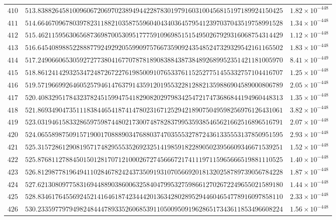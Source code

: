 \documentclass[12pt,reqno]{amsart}
\theoremstyle{remark}
\begin{document}
\begin{longtable}{clc}
$410$ & $513.8388264581009606720697023894944228783019791603100456815197189924150425$ & $1.82\times 10^{-448}$ \\
$411$ & $514.6646709678039782311882103587559604043403645795412397037043519758991528$ & $1.34\times 10^{-448}$ \\
$412$ & $515.4621159563065687369870053095177759109698515154950267929316068754314429$ & $1.12\times 10^{-448}$ \\
$413$ & $516.6454089885228887792492920559909757667359092435485247329329542161165502$ & $1.83\times 10^{-448}$ \\
$414$ & $517.2490660653059272773804167707878189083884387384892689952351421181005970$ & $8.41\times 10^{-449}$ \\
$415$ & $518.8612414293253472487267227619850091076533761152527751455332757104416707$ & $1.25\times 10^{-448}$ \\
$416$ & $519.5719669926460525794614763791435912019553228128821359886904589000806789$ & $2.05\times 10^{-448}$ \\
$417$ & $520.4083295178432378245159947541829082029798342547217473686844194960448313$ & $1.35\times 10^{-448}$ \\
$418$ & $521.8693490473511183844654187414780231671252942189075049598256976126431061$ & $3.82\times 10^{-448}$ \\
$419$ & $523.0319461583328659759874480217300748782837995359385465621662516896516791$ & $2.07\times 10^{-448}$ \\
$420$ & $524.0655898750915719001708889034768803747035553278724361335553137850951595$ & $2.93\times 10^{-448}$ \\
$421$ & $525.3157286129081957174829555352692325141985918228905023956609346671539251$ & $1.52\times 10^{-448}$ \\
$422$ & $525.8768112788450150128170712100026727456667217411197115965666519881110525$ & $1.40\times 10^{-448}$ \\
$423$ & $526.8129877819649411028467824243735091931070566920181320258789739056784228$ & $1.87\times 10^{-448}$ \\
$424$ & $527.6213080977583169448890386006325840479953275986612702672249655021589180$ & $1.44\times 10^{-448}$ \\
$425$ & $528.8346176455692452141646187423444201363428028952944604654778916097858110$ & $2.33\times 10^{-448}$ \\
$426$ & $530.2335977979498248444789335260685391105009509196286517343611853496608224$ & $1.56\times 10^{-448}$ \\

\end{longtable}
\end{document}

